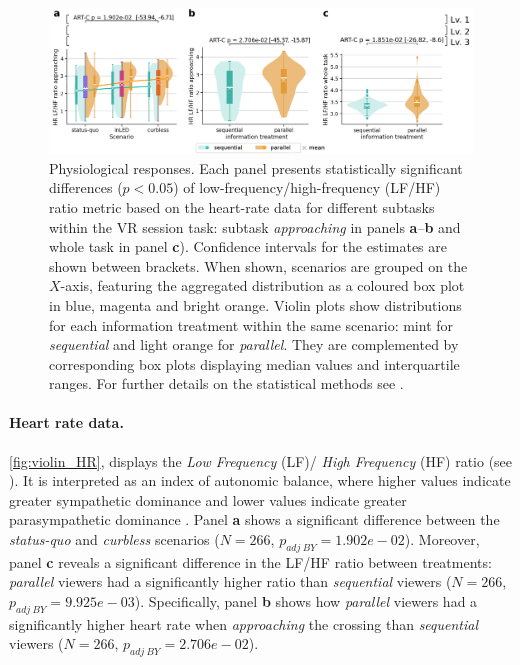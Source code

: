 \begin{figure}[hbt!]
\centering
\includegraphics[width=\linewidth]{violin_plots_HR_adv_data_BY_v05.jpg}
\caption{Physiological responses. Each panel presents statistically significant differences ($p<0.05$) of low-frequency/high-frequency (LF/HF) ratio metric based on the heart-rate data for different subtasks within the VR session task: subtask \emph{approaching} in panels \textbf{a}--\textbf{b} and whole task in panel \textbf{c}). Confidence intervals for the estimates are shown between brackets.
When shown, scenarios are grouped on the $X$-axis, featuring the aggregated distribution as a coloured box plot in blue, magenta and bright orange. Violin plots show distributions for each information treatment within the same scenario: mint for \emph{sequential} and light orange for \emph{parallel}. They are complemented by corresponding box plots displaying median values and interquartile ranges. For further details on the statistical methods see . 
}
\label{fig:violin_HR}
\end{figure}

\paragraph{Heart rate data.}
\autoref{fig:violin_HR}, displays the \emph{Low Frequency} (LF)/ \emph{High Frequency} (HF) ratio (see ). It is interpreted as an index of autonomic balance, where higher values indicate greater sympathetic dominance and lower values indicate greater parasympathetic dominance \cite{shaffer2017overview}. 
Panel \textbf{a} shows a significant difference between the \emph{status-quo} and \emph{curbless} scenarios ($N=266$, $p_{adj\ BY}=1.902e-02$).
Moreover, panel \textbf{c} reveals a significant difference in the LF/HF ratio between treatments: \emph{parallel} viewers had a significantly higher ratio than \emph{sequential} viewers ($N=266$, $p_{adj\ BY}=9.925e-03$). Specifically, panel \textbf{b} shows how \emph{parallel} viewers had a significantly higher heart rate when \emph{approaching} the crossing than \emph{sequential} viewers ($N=266$, $p_{adj\ BY}=2.706e-02$). 

